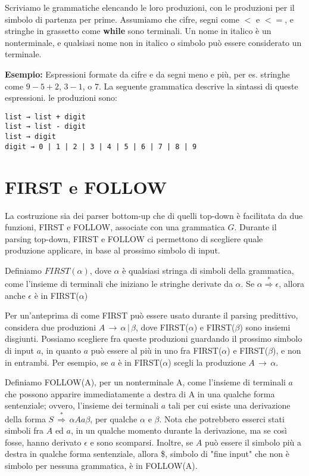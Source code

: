 Scriviamo le grammatiche elencando le loro produzioni, con le produzioni per il simbolo di partenza per prime. Assumiamo che cifre, segni come \textbf{$<$} e \textbf{$<=$}, e stringhe in grassetto come \textbf{while} sono terminali. Un nome in italico è un nonterminale, e qualsiasi nome non in italico o simbolo può essere considerato un terminale.

\textbf{Esempio:} Espressioni formate da cifre e da segni meno e più, per es. stringhe come $9-5+2$, $3-1$, o $7$. La seguente grammatica descrive la sintassi di queste espressioni. le produzioni sono:
\begin{verbatim}
list → list + digit 
list → list - digit 
list → digit
digit → 0 | 1 | 2 | 3 | 4 | 5 | 6 | 7 | 8 | 9
\end{verbatim}

\section{FIRST e FOLLOW}
La costruzione sia dei parser bottom-up che di quelli top-down è facilitata da due funzioni, FIRST e FOLLOW, associate con una grammatica $G$. Durante il parsing top-down, FIRST e FOLLOW ci permettono di scegliere quale produzione applicare, in base al prossimo simbolo di input.\cite{compilers}

Definiamo $FIRST(\alpha)$, dove $\alpha$ è qualsiasi stringa di simboli della grammatica, come l'insieme di terminali che iniziano le stringhe derivate da $\alpha$. Se $\alpha \overset{*}{\Rightarrow }  \epsilon$, allora anche $\epsilon$ è in FIRST($\alpha$)

Per un'anteprima di come FIRST può essere usato durante il parsing predittivo, considera due produzioni $A \, \rightarrow \, \alpha \, | \, \beta$, dove FIRST($\alpha$) e FIRST($\beta$) sono insiemi disgiunti. Possiamo scegliere fra queste produzioni guardando il prossimo simbolo di input $a$, in quanto $a$ può essere al più in uno fra FIRST($\alpha$) e FIRST($\beta$), e non in entrambi. Per esempio, se $a$ è in FIRST($\alpha$) scegli la produzione $A \, \rightarrow \, \alpha $.

Definiamo FOLLOW(A), per un nonterminale A, come l'insieme di terminali $a$ che possono apparire immediatamente a destra di A in una qualche forma sentenziale; ovvero, l'insieme dei terminali $a$ tali per cui esiste una derivazione della forma $S\, \overset{*}{\Rightarrow } \, \alpha A a \beta$, per qualche $\alpha$ e $\beta$. Nota che potrebbero esserci stati simboli fra $A$ ed $a$, in un qualche momento durante la derivazione, ma se così fosse, hanno derivato $\epsilon$ e sono scomparsi. Inoltre, se $A$ può essere il simbolo più a destra in qualche forma sentenziale, allora \$, simbolo di "fine input" che non è simbolo per nessuna grammatica, è in FOLLOW(A).

